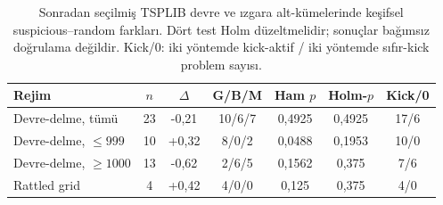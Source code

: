 \begin{table}[!htbp]
 \centering\small\setlength{\tabcolsep}{3pt}
 \caption{Sonradan seçilmiş TSPLIB devre ve ızgara alt-kümelerinde keşifsel suspicious--random farkları. Dört test Holm düzeltmelidir; sonuçlar bağımsız doğrulama değildir. Kick/0: iki yöntemde kick-aktif / iki yöntemde sıfır-kick problem sayısı.}
 \label{tab:circuit-regimes}
\begin{tabular*}{\textwidth}{@{\extracolsep{\fill}}lcccccc}
\toprule
Rejim & $n$ & $\Delta$ & G/B/M & Ham $p$ & Holm-$p$ & Kick/0 \\
\midrule
Devre-delme, tümü & 23 & -0,21 & 10/6/7 & 0,4925 & 0,4925 & 17/6 \\
Devre-delme, $\leq999$ & 10 & +0,32 & 8/0/2 & 0,0488 & 0,1953 & 10/0 \\
Devre-delme, $\geq1000$ & 13 & -0,62 & 2/6/5 & 0,1562 & 0,375 & 7/6 \\
Rattled grid & 4 & +0,42 & 4/0/0 & 0,125 & 0,375 & 4/0 \\
\bottomrule
\end{tabular*}
\end{table}
